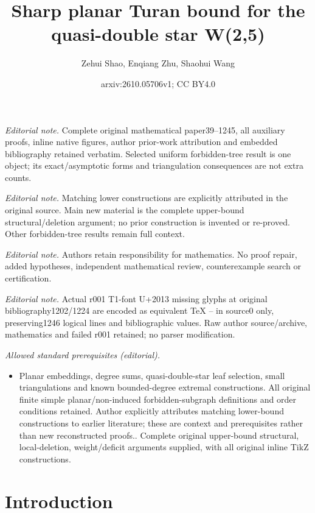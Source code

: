 \documentclass[11pt,a4paper]{article}
\title{Sharp planar Turan bound for the quasi-double star W(2,5)}
\author{Zehui Shao, Enqiang Zhu, Shaohui Wang}
\date{arxiv:2610.05706v1; CC BY4.0}
\theoremstyle{remark}
\begin{document}
\maketitle
\noindent\textit{Editorial note.} Complete original mathematical paper39--1245, all auxiliary proofs, inline native figures, author prior-work attribution and embedded bibliography retained verbatim. Selected uniform forbidden-tree result is one object; its exact/asymptotic forms and triangulation consequences are not extra counts.\par\medskip
\noindent\textit{Editorial note.} Matching lower constructions are explicitly attributed in the original source. Main new material is the complete upper-bound structural/deletion argument; no prior construction is invented or re-proved. Other forbidden-tree results remain full context.\par\medskip
\noindent\textit{Editorial note.} Authors retain responsibility for mathematics. No proof repair, added hypotheses, independent mathematical review, counterexample search or certification.\par\medskip
\noindent\textit{Editorial note.} Actual r001 T1-font U+2013 missing glyphs at original bibliography1202/1224 are encoded as equivalent TeX -- in source0 only, preserving1246 logical lines and bibliographic values. Raw author source/archive, mathematics and failed r001 retained; no parser modification.\par\medskip
\noindent\textit{Allowed standard prerequisites (editorial).}\begin{itemize}
\item Planar embeddings, degree sums, quasi-double-star leaf selection, small triangulations and known bounded-degree extremal constructions. All original finite simple planar/non-induced forbidden-subgraph definitions and order conditions retained. Author explicitly attributes matching lower-bound constructions to earlier literature; these are context and prerequisites rather than new reconstructed proofs.. Complete original upper-bound structural, local-deletion, weight/deficit arguments supplied, with all original inline TikZ constructions.
\end{itemize}\medskip
\section{Introduction}
\end{document}
